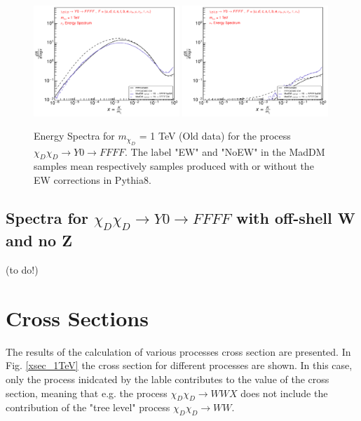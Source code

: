 \documentclass[epj,nopacs,fleqn]{svjour}
\begin{document}
\begin{figure}[!b]
\subfigure
{ \includegraphics[width=0.49\textwidth]{Fig/xdxd_Y0/1_neutrinos_mu_FFFF_xdxd_1.pdf}}
\subfigure
{ \includegraphics[width=0.49\textwidth]{Fig/xdxd_Y0/1_neutrinos_tau_FFFF_xdxd_1.pdf}}
\caption{Energy Spectra for $m_{\chi_D}$ = 1 TeV (Old data) for the process $\chi_D \chi_D \rightarrow Y0 \rightarrow FFFF$. The label "EW" and "NoEW" in the MadDM samples mean respectively samples produced with or without the EW corrections in Pythia8.}
\end{figure}


\subsection{Spectra for $\chi_D \chi_D \rightarrow Y0 \rightarrow FFFF$ with off-shell W and no Z}
(to do!)
\clearpage

\section{Cross Sections}
The results of the calculation of various processes cross section are presented. In Fig. \ref{xsec_1TeV} the cross section for different processes are shown. In this case, only the process inidcated by the lable contributes to the value of the cross section, meaning that e.g. the process $\chi_D \chi_D \rightarrow WW X$ does not include the contribution of the "tree level" process $\chi_D \chi_D \rightarrow WW$. 
\end{document}
